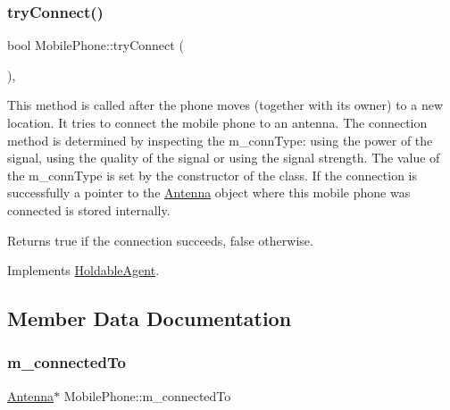 \mbox{\label{class_mobile_phone_ad91afa811cea8ee124167f5941bcda1b}} 
\subsubsection{\texorpdfstring{tryConnect()}{tryConnect()}}
{\footnotesize\ttfamily bool Mobile\+Phone\+::try\+Connect (\begin{DoxyParamCaption}{ }\end{DoxyParamCaption})\hspace{0.3cm}{\ttfamily [override]}, {\ttfamily [virtual]}}

This method is called after the phone moves (together with its owner) to a new location. It tries to connect the mobile phone to an antenna. The connection method is determined by inspecting the m\+\_\+conn\+Type\+: using the power of the signal, using the quality of the signal or using the signal strength. The value of the m\+\_\+conn\+Type is set by the constructor of the class. If the connection is successfully a pointer to the \mbox{\hyperlink{class_antenna}{Antenna}} object where this mobile phone was connected is stored internally. \begin{DoxyReturn}{Returns}
true if the connection succeeds, false otherwise. 
\end{DoxyReturn}


Implements \mbox{\hyperlink{class_holdable_agent_a0789d757d81b43ee016e9362046f6dea}{Holdable\+Agent}}.



\subsection{Member Data Documentation}
\mbox{\label{class_mobile_phone_aa143b94346485788c3563228f6043721}} 
\subsubsection{\texorpdfstring{m\_connectedTo}{m\_connectedTo}}
{\footnotesize\ttfamily \mbox{\hyperlink{class_antenna}{Antenna}}$\ast$ Mobile\+Phone\+::m\+\_\+connected\+To\hspace{0.3cm}{\ttfamily [private]}}

